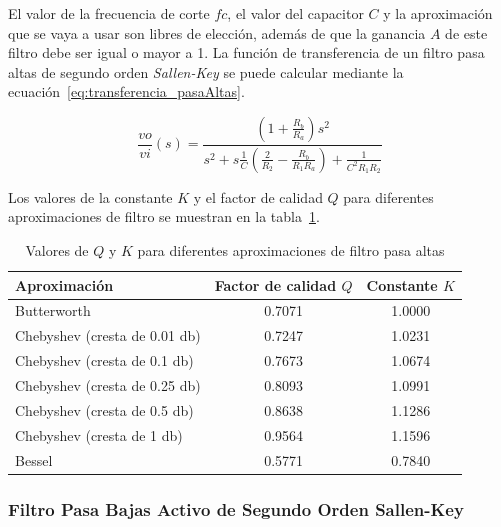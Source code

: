             El valor de la frecuencia de corte $fc$, el valor del capacitor $C$ y la aproximación que se vaya a usar son libres de elección,  además de que la ganancia $A$ de este filtro debe ser igual o mayor a 1. La función de transferencia de un filtro pasa altas de segundo orden \textit{Sallen-Key} se puede calcular mediante la ecuación~\ref{eq:transferencia_pasaAltas}.

            \begin{equation}
                \label{eq:transferencia_pasaAltas}
                \frac{vo}{vi}(s) = \frac{(1 + \frac{R_b}{R_a})s^2}{s^2 + s\frac{1}{C}(\frac{2}{R_2} - \frac{R_b}{R_1R_a}) + \frac{1}{C^2R_1R_2}}
            \end{equation}

            Los valores de la constante $K$ y el factor de calidad $Q$ para diferentes aproximaciones de filtro se muestran en la tabla~\ref{tab:valores_filtro_pasa_altas}.
                
            \begin{table}[H]
                \centering
                \begin{tabular}{ l | c | c }
                    Aproximación & Factor de calidad $Q$ & Constante $K$ \\ \hline
                    Butterworth & 0.7071 & 1.0000 \\
                    Chebyshev (cresta de 0.01 db) & 0.7247 & 1.0231 \\
                    Chebyshev (cresta de 0.1 db) & 0.7673 & 1.0674 \\
                    Chebyshev (cresta de 0.25 db) & 0.8093 & 1.0991\\
                    Chebyshev (cresta de 0.5 db) & 0.8638 & 1.1286\\
                    Chebyshev (cresta de 1 db) & 0.9564 & 1.1596\\
                    Bessel & 0.5771 & 0.7840\\
                \end{tabular}
                \caption{Valores de $Q$ y $K$ para diferentes aproximaciones de filtro pasa altas}
                \label{tab:valores_filtro_pasa_altas}
            \end{table}

        \subsubsection{Filtro Pasa Bajas Activo de Segundo Orden Sallen-Key}

